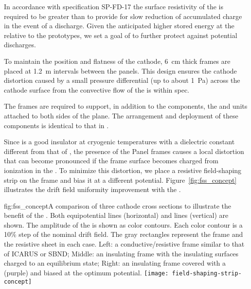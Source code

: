 In accordance with specification SP-FD-17 %
the surface resistivity of the  is required to be greater than \cathodemegohm to provide for slow reduction of accumulated charge in the event of a discharge.  Given the anticipated higher stored energy at the  
relative to the prototypes, we set a goal of \cathodegigohm to further  protect against potential discharges.  
 
To maintain the position and flatness of the cathode, 
\SI{6}{cm} thick \frfour frames are placed at \SI{1.2}{m} intervals between the  panels. This design ensures the cathode distortion caused by a small pressure differential (up to about \SI{1}{Pa}) across the cathode surface from the convective flow of the \lar is within spec. 

The  frames are required to support, in addition to the  components, the  and  units attached to both sides of the  plane. %
The arrangement and deployment of these components is identical to that in .  

 Since \frfour is a good insulator at cryogenic temperatures with a dielectric constant different from that of \lar, the presence of the  Panel frames causes a local \efield distortion that can become pronounced if the frame surface becomes charged 
from ionization in the .  To minimize this distortion, we place a resistive field-shaping strip  on the frame and bias it at a different potential.  Figure~\ref{fig:fss_concept} illustrates the drift field uniformity improvement with the .


\begin{dunefigure}{fig:fss_concept}{A comparison of three cathode cross sections to illustrate the benefit of the . Both equipotential lines (horizontal) and \efield{} lines (vertical) are shown.  The amplitude of the \efield{} is shown as color contours. Each color contour is a 10\% step of the nominal drift field.  The gray rectangles represent the frame and the resistive sheet in each case. Left: a conductive/resistive frame similar to that of ICARUS or SBND; Middle: an insulating frame with the insulating surfaces charged to an equilibrium state; Right: an insulating frame covered with a  (purple) and biased at the optimum potential. }
\texttt{[image: field-shaping-strip-concept]} %
\end{dunefigure}

